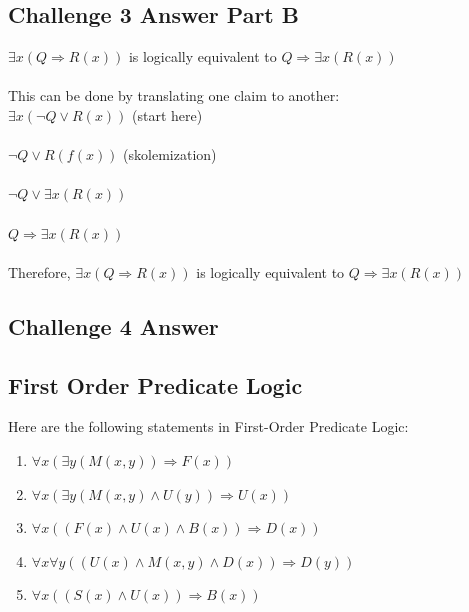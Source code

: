 \documentclass[12pt]{article}
\newcommand{\impl}{\mathbin{\Rightarrow}}
\newcommand\tab[1][1cm]{\hspace*{#1}}
\begin{document}
\subsection*{Challenge 3 Answer Part B}
$\exists x (Q \impl R(x))$ is logically equivalent to $Q \impl \exists x (R(x))$\\\\
This can be done by translating one claim to another:\\
$\exists x (\neg Q \lor R(x))$ \tab (start here) \\\\
$\neg Q \lor R(f(x))$ \tab (skolemization) \\\\
$\neg Q \lor \exists x (R(x))$ \\\\
$Q \impl \exists x (R(x))$\\\\
Therefore, $\exists x (Q \impl R(x))$ is logically equivalent to $Q \impl \exists x (R(x))$\\

\subsection*{Challenge 4 Answer}
\subsection*{First Order Predicate Logic}
Here are the following statements in First-Order Predicate Logic:\\
\begin{enumerate}
\setlength{\itemsep}{-0.5ex}
\item
$\forall x (\exists y (M(x, y)) \impl F(x))$ \\
\item
$\forall x (\exists y (M(x, y) \land U(y)) \impl U(x))$ \\
\item
$\forall x ((F(x) \land U(x) \land B(x)) \impl D(x))$ \\
\item
$\forall x \forall y ((U(x) \land M(x, y) \land D(x)) \impl D(y))$ \\
\item
$\forall x ((S(x) \land U(x)) \impl B(x))$\\
\end{enumerate}
\end{document}

